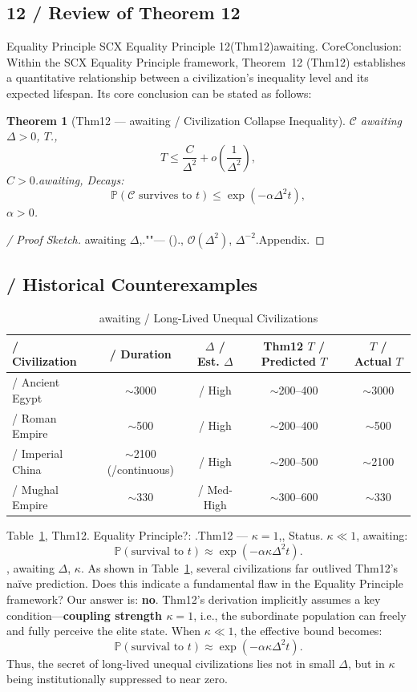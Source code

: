 \documentclass[11pt,a4paper]{article}
\newtheorem{theorem}{Theorem}[section]
\theoremstyle{definition}
\newcommand{\SCX}{\textsf{SCX}}
\newcommand{\eqtheory}{Equality Principle}
\newcommand{\civ}{\mathcal{C}}
\newcommand{\coupling}{\kappa}
\newcommand{\paren}[1]{\left(#1\right)}
\newcommand{\calO}{\mathcal{O}}
\begin{document}
\subsection{12 / Review of Theorem 12}
Equality Principle \SCX{} \eqtheory{} 12(Thm12)awaiting.
CoreConclusion: 
Within the \SCX{} \eqtheory{} framework, Theorem~12 (Thm12) establishes a quantitative relationship
between a civilization's inequality level and its expected lifespan. Its core conclusion can be stated as follows:
\begin{theorem}[Thm12 --- awaiting / Civilization Collapse Inequality]
\label{thm:thm12}
 $\civ$ awaiting $\Delta > 0$, $T$., 
\[
T \leq \frac{C}{\Delta^2} + o\paren{\frac{1}{\Delta^2}},
\]
 $C > 0$.awaiting, Decays: 
\[
\mathbb{P}(\civ \text{ survives to } t) \leq \exp\paren{-\alpha \Delta^2 t},
\]
$\alpha > 0$.
\end{theorem}
\begin{proof}[ / Proof Sketch]
awaiting $\Delta$,.""---
()., $\calO(\Delta^2)$, 
 $\Delta^{-2}$.Appendix.
\end{proof}
\subsection{ / Historical Counterexamples}
\begin{table}[htbp]
\centering
\caption{awaiting / Long-Lived Unequal Civilizations}
\label{tab:counterexamples}
\begin{tabular}{@{}lcccc@{}}
\toprule
\textbf{ / Civilization} &
\textbf{ / Duration} &
\textbf{ $\Delta$ / Est. $\Delta$} &
\textbf{Thm12 $T$ / Predicted $T$} &
\textbf{ $T$ / Actual $T$} \\
\midrule
 / Ancient Egypt & $\sim$3000 & / High & $\sim$200--400 & $\sim$3000 \\
 / Roman Empire & $\sim$500 & / High & $\sim$200--400 & $\sim$500 \\
 / Imperial China & $\sim$2100 (/continuous) & / High & $\sim$200--500 & $\sim$2100 \\
 / Mughal Empire & $\sim$330 & / Med-High & $\sim$300--600 & $\sim$330 \\
\bottomrule
\end{tabular}
\end{table}
 Table~\ref{tab:counterexamples}, Thm12.
Equality Principle?: .Thm12 ---
\textbf{ $\coupling = 1$},, Status.
 $\coupling \ll 1$, awaiting: 
\[
\mathbb{P}(\text{survival to } t) \approx \exp\paren{-\alpha \coupling \Delta^2 t}.
\]
, awaiting $\Delta$, $\coupling$.
As shown in Table~\ref{tab:counterexamples}, several civilizations far outlived Thm12's na\"ive prediction.
Does this indicate a fundamental flaw in the \eqtheory{} framework? Our answer is: \textbf{no}.
Thm12's derivation implicitly assumes a key condition---\textbf{coupling strength $\coupling = 1$},
i.e., the subordinate population can freely and fully perceive the elite state.
When $\coupling \ll 1$, the effective bound becomes:
\[
\mathbb{P}(\text{survival to } t) \approx \exp\paren{-\alpha \coupling \Delta^2 t}.
\]
Thus, the secret of long-lived unequal civilizations lies not in small $\Delta$, but in
$\coupling$ being institutionally suppressed to near zero.
\end{document}
